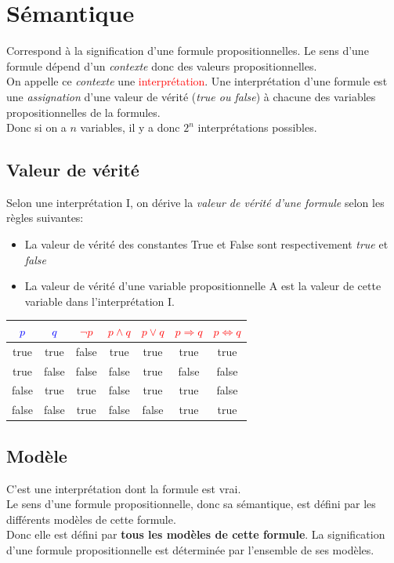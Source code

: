 \documentclass{report}
\begin{document}
\section{Sémantique}
Correspond à la signification d'une formule propositionnelles. Le sens d'une formule dépend d'un \textit{contexte} donc des valeurs propositionnelles.\\
On appelle ce \textit{contexte} une \textcolor{red}{interprétation}. Une interprétation d'une formule est une \textit{assignation} d'une valeur de vérité (\textit{true ou false}) à chacune des variables propositionnelles de la formules.\\
Donc si on a $n$ variables, il y a donc $2^n$ interprétations possibles.

\subsection{Valeur de vérité}
Selon une interprétation I, on dérive la \textit{valeur de vérité d'une formule} selon les règles suivantes:
\begin{itemize}
\item La valeur de vérité des constantes True et False sont respectivement \textit{true} et \textit{false}
\item La valeur de vérité d'une variable propositionnelle A est la valeur de cette variable dans l'interprétation I.
\end{itemize}
\begin{center}
\begin{tabular}{|c|c||c|c|c|c|c|}
\hline
\cellcolor[gray]{0.8} \textcolor{blue}{$p$} & \cellcolor[gray]{0.8} \textcolor{blue}{$q$} & \cellcolor[gray]{0.8} \textcolor{red}{$\neg p$} & \cellcolor[gray]{0.8} \textcolor{red}{$p \wedge q$} & \cellcolor[gray]{0.8} \textcolor{red}{$p \vee q$} & \cellcolor[gray]{0.8} \textcolor{red}{$p \Rightarrow q$} &\cellcolor[gray]{0.8} \textcolor{red}{$p \Leftrightarrow q$}\\
\hline
true & true & false & true & true & true & true \\
\hline
true & false & false & false & true & false & false \\
\hline
false & true & true & false & true & true & false \\
\hline
false & false & true & false & false & true & true \\
\hline
\end{tabular}
\end{center}

\subsection{Modèle}
C'est une interprétation dont la formule est vrai.\\
Le sens d'une formule propositionnelle, donc sa sémantique, est défini par les différents modèles de cette formule.\\
Donc elle est défini par \textbf{tous les modèles de cette formule}. La signification d'une formule propositionnelle est déterminée par l'ensemble de ses modèles.
\end{document}
